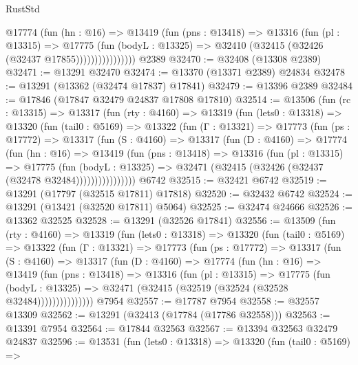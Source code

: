 \begin{lexlean}{RustStd}
\begin{coremodule}
                    @17774
                      (fun (hn : @16) =>
                      @13419
                        (fun (pns : @13418) =>
                        @13316
                          (fun (pl : @13315) =>
                          @17775
                            (fun (bodyL : @13325) =>
                            @32410 (@32415 (@32426 (@32437 @17855))))))))))))))))
    @2389
@32470 := @32408 (@13308 @2389)
@32471 := @13291 @32470
@32474 := @13370 (@13371 @2389) @24834
@32478 := @13291 (@13362 (@32474 @17837) @17841)
@32479 := @13396 @2389
@32484 := @17846 (@17847 @32479 @24837 @17808 @17810)
@32514 := @13506
    (fun (rc : @13315) =>
    @13317
      (fun (rty : @4160) =>
      @13319
        (fun (lets0 : @13318) =>
        @13320
          (fun (tail0 : @5169) =>
          @13322
            (fun (Γ : @13321) =>
            @17773
              (fun (ps : @17772) =>
              @13317
                (fun (S : @4160) =>
                @13317
                  (fun (D : @4160) =>
                  @17774
                    (fun (hn : @16) =>
                    @13419
                      (fun (pns : @13418) =>
                      @13316
                        (fun (pl : @13315) =>
                        @17775
                          (fun (bodyL : @13325) =>
                          @32471 (@32415 (@32426 (@32437 (@32478 @32484))))))))))))))))
    @6742
@32515 := @32421 @6742
@32519 := @13291 (@17797 (@32515 @17811) @17818)
@32520 := @32432 @6742
@32524 := @13291 (@13421 (@32520 @17811) @5064)
@32525 := @32474 @24666
@32526 := @13362 @32525
@32528 := @13291 (@32526 @17841)
@32556 := @13509
    (fun (rty : @4160) =>
    @13319
      (fun (lets0 : @13318) =>
      @13320
        (fun (tail0 : @5169) =>
        @13322
          (fun (Γ : @13321) =>
          @17773
            (fun (ps : @17772) =>
            @13317
              (fun (S : @4160) =>
              @13317
                (fun (D : @4160) =>
                @17774
                  (fun (hn : @16) =>
                  @13419
                    (fun (pns : @13418) =>
                    @13316
                      (fun (pl : @13315) =>
                      @17775
                        (fun (bodyL : @13325) =>
                        @32471 (@32415 (@32519 (@32524 (@32528 @32484)))))))))))))))
    @7954
@32557 := @17787 @7954
@32558 := @32557 @13309
@32562 := @13291 (@32413 (@17784 (@17786 @32558)))
@32563 := @13391 @7954
@32564 := @17844 @32563
@32567 := @13394 @32563 @32479 @24837
@32596 := @13531
    (fun (lets0 : @13318) =>
    @13320
      (fun (tail0 : @5169) =>

\end{coremodule}
\end{lexlean}
